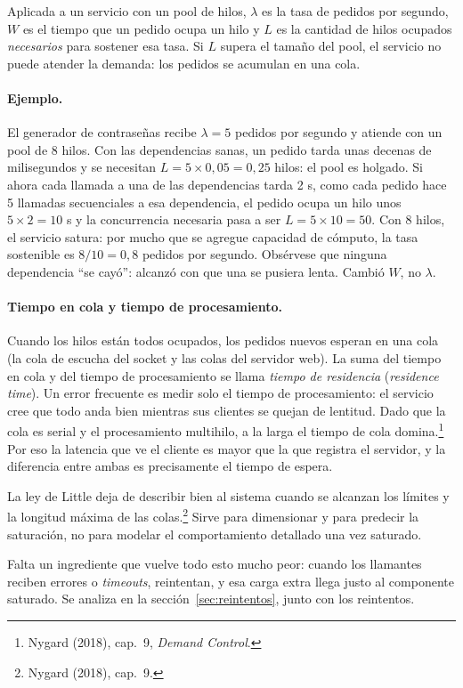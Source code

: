 \documentclass[variant=apuntes,cover=institutional,mode=screen]{ua-engineering-v6-article}
\begin{document}
Aplicada a un servicio con un pool de hilos, $\lambda$ es la tasa de pedidos por segundo, $W$ es el tiempo que un pedido ocupa un hilo y $L$ es la cantidad de hilos ocupados \emph{necesarios} para sostener esa tasa. Si $L$ supera el tamaño del pool, el servicio no puede atender la demanda: los pedidos se acumulan en una cola.

\paragraph{Ejemplo.} El generador de contraseñas recibe $\lambda = 5$ pedidos por segundo y atiende con un pool de 8 hilos. Con las dependencias sanas, un pedido tarda unas decenas de milisegundos y se necesitan $L = 5 \times 0{,}05 = 0{,}25$ hilos: el pool es holgado. Si ahora cada llamada a una de las dependencias tarda 2 s, como cada pedido hace 5 llamadas secuenciales a esa dependencia, el pedido ocupa un hilo unos $5 \times 2 = 10$ s y la concurrencia necesaria pasa a ser $L = 5 \times 10 = 50$. Con 8 hilos, el servicio satura: por mucho que se agregue capacidad de cómputo, la tasa sostenible es $8 / 10 = 0{,}8$ pedidos por segundo. Obsérvese que ninguna dependencia ``se cayó'': alcanzó con que una se pusiera lenta. Cambió $W$, no $\lambda$.

\paragraph{Tiempo en cola y tiempo de procesamiento.} Cuando los hilos están todos ocupados, los pedidos nuevos esperan en una cola (la cola de escucha del socket y las colas del servidor web). La suma del tiempo en cola y del tiempo de procesamiento se llama \emph{tiempo de residencia} (\emph{residence time}). Un error frecuente es medir solo el tiempo de procesamiento: el servicio cree que todo anda bien mientras sus clientes se quejan de lentitud. Dado que la cola es serial y el procesamiento multihilo, a la larga el tiempo de cola domina.\footnote{Nygard (2018), cap.~9, \emph{Demand Control}.} Por eso la latencia que ve el cliente es mayor que la que registra el servidor, y la diferencia entre ambas es precisamente el tiempo de espera.

La ley de Little deja de describir bien al sistema cuando se alcanzan los límites y la longitud máxima de las colas.\footnote{Nygard (2018), cap.~9.} Sirve para dimensionar y para predecir la saturación, no para modelar el comportamiento detallado una vez saturado.

Falta un ingrediente que vuelve todo esto mucho peor: cuando los llamantes reciben errores o \emph{timeouts}, reintentan, y esa carga extra llega justo al componente saturado. Se analiza en la sección~\ref{sec:reintentos}, junto con los reintentos.
\end{document}
